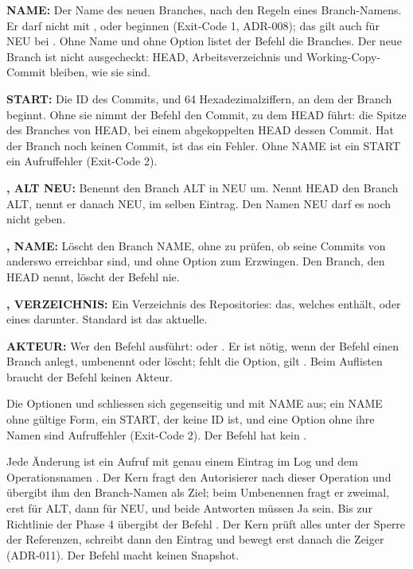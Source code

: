 \startitemize
\item {\bf NAME:} Der Name des neuen Branches, nach den Regeln eines Branch-Namens. Er darf nicht
mit ,  oder  beginnen (Exit-Code 1, ADR-008);
das gilt auch für NEU bei . Ohne Name und ohne Option listet der Befehl die Branches.
Der neue Branch ist nicht ausgecheckt: HEAD,
Arbeitsverzeichnis und Working-Copy-Commit bleiben, wie sie sind.
\item {\bf START:} Die ID des Commits,  und 64 Hexadezimalziffern, an dem der Branch
beginnt. Ohne sie nimmt der Befehl den Commit, zu dem HEAD führt: die Spitze des Branches von HEAD,
bei einem abgekoppelten HEAD dessen Commit. Hat der Branch noch keinen Commit, ist das ein Fehler.
Ohne NAME ist ein START ein Aufruffehler (Exit-Code 2).
\item {\bf {},  ALT NEU:} Benennt den Branch ALT in NEU um. Nennt HEAD den
Branch ALT, nennt er danach NEU, im selben Eintrag. Den Namen NEU darf es noch nicht geben.
\item {\bf {},  NAME:} Löscht den Branch NAME, ohne zu prüfen, ob seine
Commits von anderswo erreichbar sind, und ohne Option zum Erzwingen. Den Branch, den HEAD nennt,
löscht der Befehl nie.
\item {\bf {},  VERZEICHNIS:} Ein Verzeichnis des Repositories:
das, welches  enthält, oder eines darunter. Standard ist das aktuelle.
\item {\bf {} AKTEUR:} Wer den Befehl ausführt:  oder
. Er ist nötig, wenn der Befehl
einen Branch anlegt, umbenennt oder löscht; fehlt die Option, gilt . Beim
Auflisten braucht der Befehl keinen Akteur.
\stopitemize

Die Optionen  und  schliessen sich gegenseitig und mit NAME aus; ein NAME
ohne gültige Form, ein START, der keine ID ist, und eine Option ohne ihre Namen sind
Aufruffehler (Exit-Code 2). Der Befehl hat kein .

Jede Änderung ist ein Aufruf mit genau einem Eintrag im Log und dem Operationsnamen
. Der Kern fragt den Autorisierer nach dieser Operation und übergibt ihm den
Branch-Namen als Ziel; beim Umbenennen fragt er zweimal, erst für ALT, dann für NEU, und beide
Antworten müssen Ja sein. Bis zur Richtlinie der Phase 4 übergibt der Befehl .
Der Kern prüft alles unter der Sperre der Referenzen, schreibt dann den Eintrag und bewegt erst
danach die Zeiger (ADR-011). Der Befehl macht keinen Snapshot.

